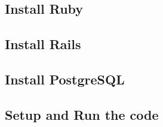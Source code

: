 
\subsection*{Install Ruby}
\label{sect:installation:ruby}


\subsection*{Install Rails}
\label{sect:installation:rails}


\subsection*{Install PostgreSQL}
\label{sect:installation:postgresql}


\subsection*{Setup and Run the code}
\label{sect:installation:code}
